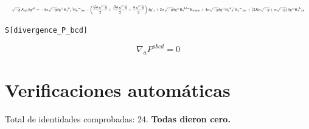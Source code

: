 \documentclass[11pt,a4paper]{article}
\begin{document}
\[
\resizebox{\textwidth}{!}{$\displaystyle \sqrt{-g}\,E_{ab}\,\delta g^{ab} = -4\alpha\sqrt{-g}\delta \mathrm{g}{}^{ij}\mathrm{R}{}_{i}{}^{k}{}_{j}{}^{l}\mathrm{R}{}_{k}{}^{m}{}_{lm} - \left(\frac{\mathcal{G} \alpha \sqrt{-g}}{2} + \frac{R \alpha \sqrt{-g}}{2} + \frac{\alpha \sqrt{-g}}{2}\right)\delta \mathrm{g}{}^{i}{}_{i} + 2\alpha\sqrt{-g}\delta \mathrm{g}{}^{ij}\mathrm{R}{}_{i}{}^{klm}\mathrm{R}{}_{jklm} + 4\alpha\sqrt{-g}\delta \mathrm{g}{}^{ij}\mathrm{R}{}_{i}{}^{k}{}_{k}{}^{l}\mathrm{R}{}_{j}{}^{m}{}_{lm} + \left(2 R \alpha \sqrt{-g} + \alpha \sqrt{-g}\right)\delta \mathrm{g}{}^{ij}\mathrm{R}{}_{i}{}^{k}{}_{jk}$}
\]


\noindent\texttt{S[divergence\_P\_bcd]}

\[
\boxed{\nabla_a P^{abcd} = 0}
\]


\section*{Verificaciones automáticas}
\noindent Total de identidades comprobadas: 24. \textbf{Todas dieron cero.}
\end{document}
